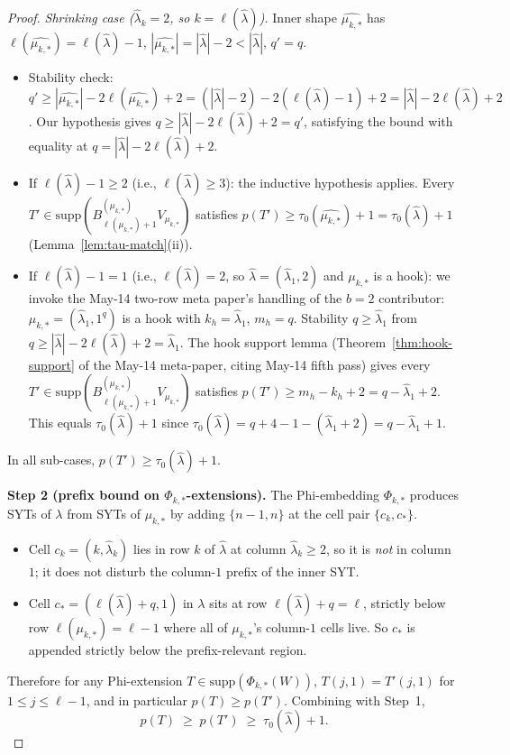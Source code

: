 \documentclass[11pt]{article}
\theoremstyle{definition}
\newcommand{\hatl}{\widehat\lambda}
\newcommand{\supp}{\mathrm{supp}}
\newcommand{\elh}{\ell(\hatl)}
\begin{document}
\begin{proof}
\smallskip\emph{Shrinking case ($\hatl_k = 2$, so $k = \elh$).}
Inner shape $\widehat{\mu_{k,*}}$ has $\ell(\widehat{\mu_{k,*}}) =
\elh - 1$, $|\widehat{\mu_{k,*}}| = |\hatl| - 2 < |\hatl|$, $q' = q$.
\begin{itemize}[topsep=0.2em,itemsep=0.1em]
\item Stability check: $q' \ge |\widehat{\mu_{k,*}}| -
   2\ell(\widehat{\mu_{k,*}}) + 2 = (|\hatl| - 2) - 2(\elh - 1) + 2 =
   |\hatl| - 2\elh + 2$.  Our hypothesis gives $q \ge |\hatl| -
   2\elh + 2 = q'$, satisfying the bound with equality at
   $q = |\hatl| - 2\elh + 2$.\checkmark
\item If $\elh - 1 \ge 2$ (i.e., $\elh \ge 3$): the inductive
   hypothesis applies.  Every $T' \in \supp(B^{(\mu_{k,*})}_{\ell(\mu_{k,*})+1}
   V_{\mu_{k,*}})$ satisfies $p(T') \ge \tau_0(\widehat{\mu_{k,*}}) + 1 =
   \tau_0(\hatl) + 1$ (Lemma~\ref{lem:tau-match}(ii)).
\item If $\elh - 1 = 1$ (i.e., $\elh = 2$, so $\hatl = (\hatl_1, 2)$
   and $\mu_{k,*}$ is a hook): we invoke the May-14 two-row meta paper's
   handling of the $b = 2$ contributor: $\mu_{k,*} = (\hatl_1, 1^q)$
   is a hook with $k_h = \hatl_1$, $m_h = q$.  Stability $q \ge \hatl_1$
   from $q \ge |\hatl| - 2\elh + 2 = \hatl_1$.  The hook support lemma
   (Theorem~\ref{thm:hook-support} of the May-14 meta-paper, citing
   May-14 fifth pass) gives every
   $T' \in \supp(B^{(\mu_{k,*})}_{\ell(\mu_{k,*})+1} V_{\mu_{k,*}})$
   satisfies $p(T') \ge m_h - k_h + 2 = q - \hatl_1 + 2$.  This equals
   $\tau_0(\hatl) + 1$ since $\tau_0(\hatl) = q + 4 - 1 - (\hatl_1 + 2)
   = q - \hatl_1 + 1$.
\end{itemize}

In all sub-cases, $p(T') \ge \tau_0(\hatl) + 1$.

\medskip\textbf{Step 2 (prefix bound on $\Phi_{k,*}$-extensions).}
The Phi-embedding $\Phi_{k,*}$ produces SYTs of $\lambda$ from SYTs of
$\mu_{k,*}$ by adding $\{n-1, n\}$ at the cell pair $\{c_k, c_*\}$.
\begin{itemize}[topsep=0.2em,itemsep=0.1em]
\item Cell $c_k = (k, \hatl_k)$ lies in row $k$ of $\hatl$ at column
   $\hatl_k \ge 2$, so it is \emph{not} in column $1$; it does not
   disturb the column-$1$ prefix of the inner SYT.
\item Cell $c_* = (\elh + q, 1)$ in $\lambda$ sits at row $\elh + q
   = \ell$, strictly below row $\ell(\mu_{k,*}) = \ell - 1$ where all
   of $\mu_{k,*}$'s column-$1$ cells live.  So $c_*$ is appended
   strictly below the prefix-relevant region.
\end{itemize}
Therefore for any Phi-extension $T \in \supp(\Phi_{k,*}(W))$,
$T(j, 1) = T'(j, 1)$ for $1 \le j \le \ell - 1$, and in particular
$p(T) \ge p(T')$.  Combining with Step~1,
\[
   p(T) \;\ge\; p(T') \;\ge\; \tau_0(\hatl) + 1.
\]


\end{proof}
\end{document}
